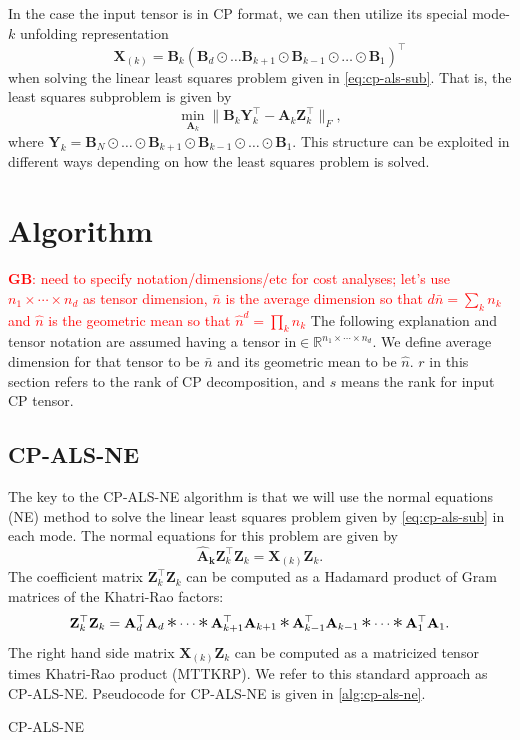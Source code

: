 \documentclass{article}
\newcommand{\mat}[1]{\mathbf{#1}}
\DeclareMathOperator*{\hada}{\scalebox{1.5}{$\ast$}}
\newcommand{\GB}[1]{\textcolor{red}{\textbf{GB}: #1}}
\begin{document}
In the case the input tensor is in CP format, we can then utilize its special mode-$k$ unfolding representation 
$$\mat{X}_{(k)} = \mat{B}_k(\mat{B}_d \odot \dots \mat{B}_{k+1} \odot \mat{B}_{k-1} \odot \dots \odot \mat{B}_1)^\top$$
when solving the linear least squares problem given in \cref{eq:cp-als-sub}. 
That is, the least squares subproblem is given by 
\begin{equation}
\label{eq:cp-als-sub-ktensor}
\min_{\mat{A}_k}\|\mat{B}_{k}\mat{Y}_k^\top-\mat{A}_k\mat{Z}_k^\top\|_F,
\end{equation}
where $\mat{Y}_k = \mat{B}_N \odot \dots \odot \mat{B}_{k+1} \odot \mat{B}_{k-1} \odot \dots \odot \mat{B}_1$.
This structure can be exploited in different ways depending on how the least squares problem is solved.


\section{Algorithm} \label{sec:algo}

\GB{need to specify notation/dimensions/etc for cost analyses; let's use $n_1 \times \cdots \times n_d$ as tensor dimension, $\bar n$ is the average dimension so that $d\bar n = \sum_k n_k$ and $\hat n$ is the geometric mean so that $\hat n^d = \prod_k n_k$}
The following explanation and tensor notation are assumed having a tensor in$\in \mathbb{R}^{n_1 \times \cdots \times n_d}$.
We define average dimension for that tensor to be $\bar n$ and its geometric mean to be $\hat n$.
$r$ in this section refers to the rank of CP decomposition, and $s$ means the rank for input CP tensor.
\subsection{CP-ALS-NE}


The key to the CP-ALS-NE algorithm is that we will use the normal equations (NE) method to solve the linear least squares problem given by \cref{eq:cp-als-sub} in each mode.
The normal equations for this problem are given by
\begin{equation}
  \label{eq:CP-NE}
  \mat{\hat{A}_k}\mat{Z}_k^\top\mat{Z}_k = \mat{X}_{(k)}\mat{Z}_k.
\end{equation}
The coefficient matrix $\mat{Z}_k^\top\mat{Z}_k$ can be computed as a Hadamard product of Gram matrices of the Khatri-Rao factors:
\begin{equation*}
\mat{Z}_k^\top\mat{Z}_k %
= \mat{A}_d^\top \mat{A}_d \hada \cdots \hada \mat{A}_{k+1}^\top\mat{A}_{k+1} \hada \mat{A}_{k-1}^\top\mat{A}_{k-1} \hada \cdots \hada \mat{A}_{1}^\top\mat{A}_{1}.
\end{equation*}
The right hand side matrix $\mat{X}_{(k)}\mat{Z}_k$ can be computed as a matricized tensor times Khatri-Rao product (MTTKRP).
We refer to this standard approach as CP-ALS-NE. Pseudocode for CP-ALS-NE is given in \cref{alg:cp-als-ne}.
\begin{algorithm}[!ht]
  \caption{CP-ALS-NE}
  \label{alg:cp-als-ne}
  
\end{algorithm}
\end{document}
